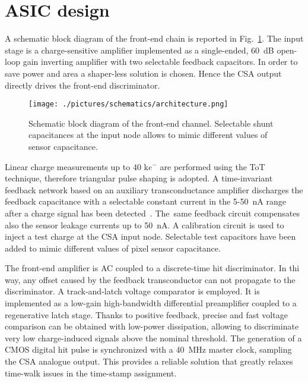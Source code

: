 \documentclass[conference]{./templates/IEEEtran/IEEEtran}
\begin{document}
\vspace*{1.5cm}



\section{ASIC design}
\noindent A schematic block diagram of the front-end chain is reported in Fig.~\ref{archi}.
The input stage is a charge-sensitive amplifier implemented as a single-ended,
60~dB open-loop gain inverting amplifier with two selectable feedback capacitors.
In order to save power and area a shaper-less solution is chosen. Hence the 
CSA output directly drives the front-end discriminator.



\begin{center}
\begin{figure}[!htpb]
\centering
\texttt{[image: ./pictures/schematics/architecture.png]}
\caption{Schematic block diagram of the front-end channel. Selectable shunt capacitances 
         at the input node allows to mimic different values of sensor capacitance.}  
\label{archi}
\end{figure}
\end{center}



 Linear charge measurements 
up to 40 k$e^{-}$ are performed using the ToT technique, therefore triangular pulse shaping is adopted.
A time-invariant feedback network based on an auxiliary transconductance amplifier discharges the feedback capacitance 
with a selectable constant current in the 5-50~nA range after a charge signal has been detected~\cite{Krummenacher1991}.
The~same feedback circuit compensates also the sensor leakage currents up to 50~nA.
A calibration circuit is used to inject a test charge at the CSA input node. Selectable test
capacitors have been added to mimic different values of pixel sensor capacitance.


The front-end amplifier is AC coupled to a discrete-time hit discriminator. In thi way, any offset caused by the feedback 
transconductor can not propagate to the discriminator.
A track-and-latch voltage comparator is employed. It is implemented as
a low-gain high-bandwidth differential preamplifier coupled to a regenerative latch stage. 
Thanks to positive feedback, precise and fast voltage comparison can be obtained with 
low-power dissipation, allowing to discriminate very low charge-induced signals above 
the nominal threshold. The generation of a CMOS digital hit pulse is synchronized with a
40~MHz master clock, sampling the CSA analogue output. This provides
a reliable solution that greatly relaxes time-walk issues in the time-stamp assignment.
\end{document}
